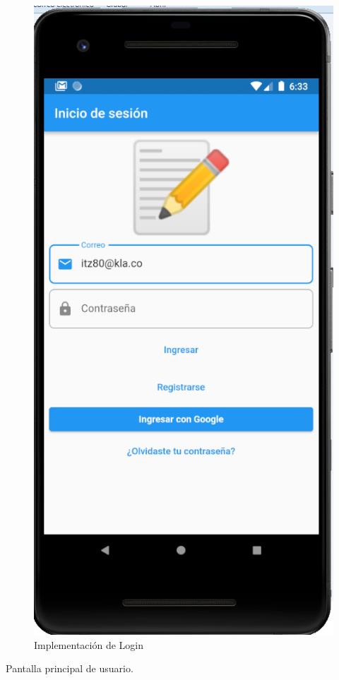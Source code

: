 \documentclass{article}
\begin{document}
\begin{figure}[H]
    \centering
    \includegraphics[scale=0.8]{imgs/Imp/Login1}
    \caption{Implementación de Login}
\end{figure}
Pantalla principal de usuario.
\end{document}
